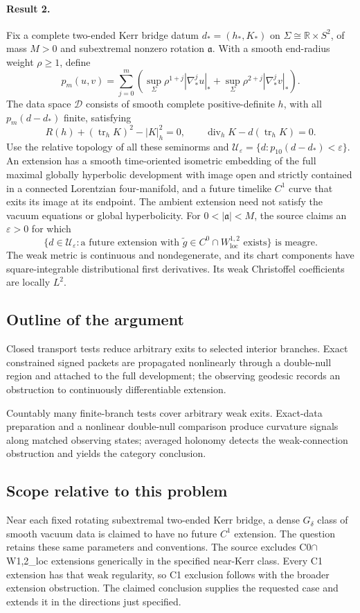 \documentclass[11pt]{article}
\begin{document}
\paragraph{Result 2.} Fix a complete two-ended Kerr bridge datum \(d_*=(h_*,K_*)\) on \(\Sigma\cong\mathbb R\times S^2\), of mass \(M>0\) and subextremal nonzero rotation \(\mathfrak a\). With a smooth end-radius weight \(\rho\ge1\), define
\[
 p_m(u,v)=\sum_{j=0}^m\left(\sup_\Sigma\rho^{1+j}|\nabla_*^ju|_*+
 \sup_\Sigma\rho^{2+j}|\nabla_*^jv|_*\right).
\]
The data space \(\mathcal D\) consists of smooth complete positive-definite \(h\), with all \(p_m(d-d_*)\) finite, satisfying
\[
 R(h)+(\operatorname{tr}_hK)^2-|K|_h^2=0,\qquad
 \operatorname{div}_hK-d(\operatorname{tr}_hK)=0.
\]
Use the relative topology of all these seminorms and \(\mathcal U_\varepsilon=\{d:p_{10}(d-d_*)<\varepsilon\}\). An extension has a smooth time-oriented isometric embedding of the full maximal globally hyperbolic development with image open and strictly contained in a connected Lorentzian four-manifold, and a future timelike \(C^1\) curve that exits its image at its endpoint. The ambient extension need not satisfy the vacuum equations or global hyperbolicity. For \(0<|\mathfrak a|<M\), the source claims an \(\varepsilon>0\) for which
\[
 \{d\in\mathcal U_\varepsilon:\text{a future extension with }\widetilde g\in C^0\cap W^{1,2}_{\mathrm{loc}}\text{ exists}\}
 \text{ is meagre}.
\]
The weak metric is continuous and nondegenerate, and its chart components have square-integrable distributional first derivatives. Its weak Christoffel coefficients are locally \(L^2\).

\subsection{Outline of the argument}
Closed transport tests reduce arbitrary exits to selected interior branches. Exact constrained signed packets are propagated nonlinearly through a double-null region and attached to the full development; the observing geodesic records an obstruction to continuously differentiable extension.

Countably many finite-branch tests cover arbitrary weak exits. Exact-data preparation and a nonlinear double-null comparison produce curvature signals along matched observing states; averaged holonomy detects the weak-connection obstruction and yields the category conclusion.

\subsection{Scope relative to this problem}
Near each fixed rotating subextremal two-ended Kerr bridge, a dense $G_\delta$ class of smooth vacuum data is claimed to have no future $C^1$ extension. The question retains these same parameters and conventions. The source excludes C0\(\cap\)W1,2\_loc extensions generically in the specified near-Kerr class. Every C1 extension has that weak regularity, so C1 exclusion follows with the broader extension obstruction. The claimed conclusion supplies the requested case and extends it in the directions just specified.
\end{document}
